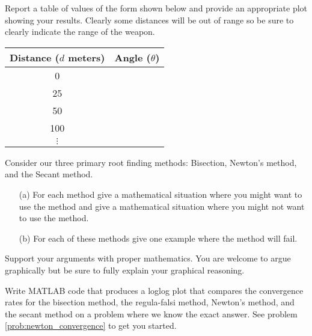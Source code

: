 \begin{problem}
\begin{enumerate}
            Report a table of values of the form shown below and provide an appropriate
            plot showing your results.  Clearly some distances will be out of range so be
            sure to clearly indicate the range of the weapon.
            \begin{center}
                \begin{tabular}{|c|c|}
                    \hline
                    Distance ($d$ meters) & Angle ($\theta$) \\ \hline \hline
                    0 & \\
                    25 & \\
                    50 & \\
                    100 & \\
                    $\vdots$ & \\ \hline
                \end{tabular}
            \end{center}
    \end{enumerate}
\end{problem}


\begin{problem}
    Consider our three primary root finding methods: Bisection, Newton's method, and the
    Secant method.  
    \begin{enumerate}
        \item[(a)] For each method give a mathematical situation where you might want to
            use the method and give a mathematical situation where you might not want to
            use the method.  
        \item[(b)] For each of these methods give one example where the method will fail.  
        \end{enumerate}
        Support your arguments with proper mathematics.  You are welcome to argue
        graphically but be sure to fully explain your graphical reasoning.
\end{problem}


\begin{problem}
    Write MATLAB code that produces a loglog plot that compares the convergence rates for
    the bisection method, the regula-falsi method, Newton's method, and the secant method
    on a problem where we know the exact answer. See problem \ref{prob:newton_convergence}
    to get you started.
\end{problem}




